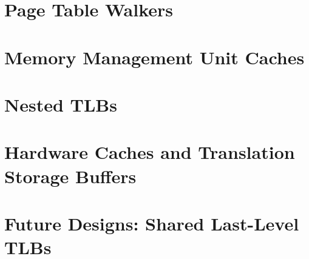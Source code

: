 \documentclass{article}
\begin{document}
\section{Page Table Walkers}\label{sec:page-table-walkers}

\section{Memory Management Unit Caches}\label{sec:mmu-caches}

\section{Nested TLBs}\label{sec:ntlbs}

\section{Hardware Caches and Translation Storage Buffers}\label{sec:hw-caches-tsbs}

\section{Future Designs: Shared Last-Level TLBs}\label{sec:future-designs-shared-tlbs}
\end{document}
